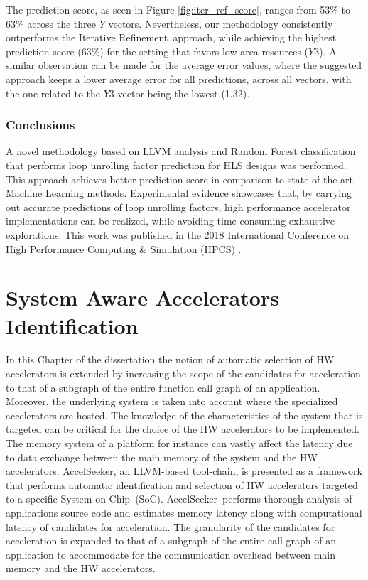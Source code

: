 \documentclass[]{usiinfthesis}
\newcommand{\aseeker}{{AccelSeeker}}
\newcommand{\SoC}{{System-on-Chip}}
\newcommand{\ItRef}{{Iterative Refinement}}
\begin{document}
The prediction score, as seen in Figure \ref{fig:iter_ref_score}, ranges from 53\% to 63\% across the three 
$Y$ vectors. Nevertheless, our methodology consistently outperforms the \ItRef\ approach, while achieving 
the highest prediction score (63\%) for the setting that favors low area resources ($Y3$). A similar
observation can be made for the average error values, where the suggested approach keeps a lower 
average error for all predictions, across all vectors, with the one related to the $Y3$ vector 
being the lowest (1.32).\par

\subsection{Conclusions}

A novel methodology based on LLVM analysis and Random Forest classification that performs loop unrolling 
factor prediction for HLS designs was performed. This approach achieves better prediction score 
in comparison to state-of-the-art Machine Learning methods. Experimental evidence showcases that, 
by carrying out accurate predictions of loop unrolling factors, high performance accelerator 
implementations can be realized, while avoiding time-consuming exhaustive explorations. This work was 
published in the 2018 International Conference on High Performance Computing \& Simulation (HPCS) 
\cite{ZacharopoulosJul18}.


%
%
%
%
%  
%
%
%
%
%


\chapter[System Aware Accelerators Identification]
{System Aware Accelerators Identification}

In this Chapter of the dissertation the notion of automatic selection of HW accelerators is extended
by increasing the scope of the candidates for acceleration to that of a subgraph of the entire function 
call graph of an application. Moreover, the underlying system is taken into account where the specialized 
accelerators are hosted. The knowledge
of the characteristics of the system that is targeted can be critical for the choice of the HW accelerators
to be implemented. The memory system of a platform for instance can vastly affect the latency due to data
exchange between the main memory of the system and the HW accelerators. 
\aseeker, an LLVM-based tool-chain, is presented as a framework that performs automatic identification 
and selection of HW accelerators targeted to a specific \SoC\ (SoC).
\aseeker\ performs thorough analysis of applications source code and estimates memory latency along with 
computational latency of candidates for acceleration. 
The granularity of the candidates for acceleration 
is expanded to that of a subgraph of the entire call graph of an application to accommodate for the 
communication overhead between main memory and the HW accelerators.
\end{document}
